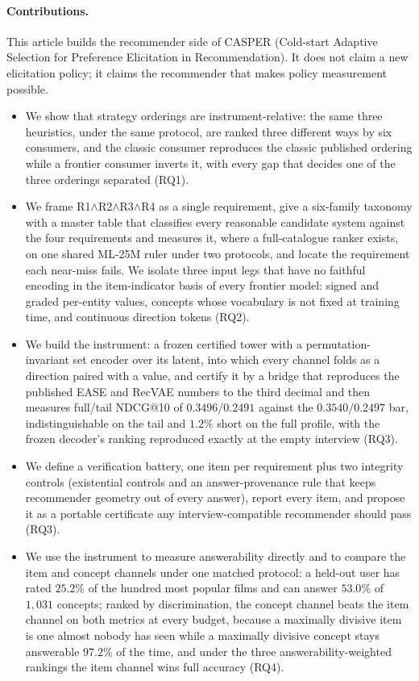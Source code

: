 \documentclass[manuscript,screen]{acmart}
\begin{document}
\paragraph{Contributions.} This article builds the recommender side of CASPER (Cold-start Adaptive Selection for Preference Elicitation in Recommendation). It does not claim a new elicitation policy; it claims the recommender that makes policy measurement possible.
\begin{itemize}[leftmargin=1.4em,itemsep=2pt]
  \item We show that strategy orderings are instrument-relative: the same three heuristics, under the same protocol, are ranked three different ways by six consumers, and the classic consumer reproduces the classic published ordering while a frontier consumer inverts it, with every gap that decides one of the three orderings separated (RQ1).
  \item We frame R1$\wedge$R2$\wedge$R3$\wedge$R4 as a single requirement, give a six-family taxonomy with a master table that classifies every reasonable candidate system against the four requirements and measures it, where a full-catalogue ranker exists, on one shared ML-25M ruler under two protocols, and locate the requirement each near-miss fails. We isolate three input legs that have no faithful encoding in the item-indicator basis of every frontier model: signed and graded per-entity values, concepts whose vocabulary is not fixed at training time, and continuous direction tokens (RQ2).
  \item We build the instrument: a frozen certified tower with a permutation-invariant set encoder over its latent, into which every channel folds as a direction paired with a value, and certify it by a bridge that reproduces the published EASE and RecVAE numbers to the third decimal and then measures full/tail NDCG@10 of $0.3496/0.2491$ against the $0.3540/0.2497$ bar, indistinguishable on the tail and $1.2\%$ short on the full profile, with the frozen decoder's ranking reproduced exactly at the empty interview (RQ3).
  \item We define a verification battery, one item per requirement plus two integrity controls (existential controls and an answer-provenance rule that keeps recommender geometry out of every answer), report every item, and propose it as a portable certificate any interview-compatible recommender should pass (RQ3).
  \item We use the instrument to measure answerability directly and to compare the item and concept channels under one matched protocol: a held-out user has rated $25.2\%$ of the hundred most popular films and can answer $53.0\%$ of $1{,}031$ concepts; ranked by discrimination, the concept channel beats the item channel on both metrics at every budget, because a maximally divisive item is one almost nobody has seen while a maximally divisive concept stays answerable $97.2\%$ of the time, and under the three answerability-weighted rankings the item channel wins full accuracy (RQ4).
\end{itemize}
\end{document}
